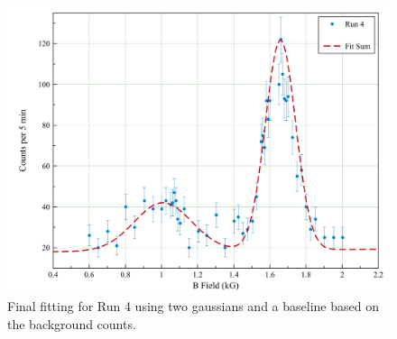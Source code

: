 \begin{figure}[H]
\begin{center}
\includegraphics[width=4 in]{run4_err_fit.png}
\caption{Final fitting for Run 4 using two gaussians and a baseline based on the background counts.}
\end{center}
\end{figure}

